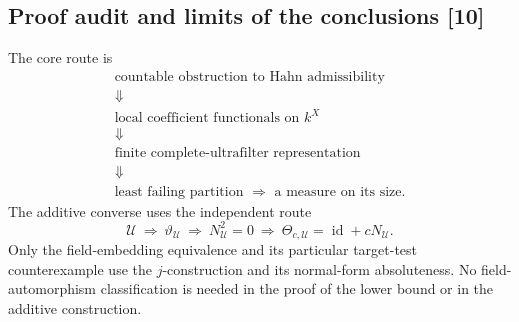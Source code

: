 \documentclass[11pt,letterpaper]{article}
\numberwithin{equation}{section}
\theoremstyle{definition}
\theoremstyle{remark}
\newcommand{\src}[1]{\textup{\textsf{\small[#1]}}}%
\newcommand{\id}{\operatorname{id}}
\begin{document}
\subsection{Proof audit and limits of the conclusions \src{10}}
\label{lce:mf:sub:audit}
The core route is
\[
 \begin{gathered}
 \text{countable obstruction to Hahn admissibility}\\
 \Downarrow\\
 \text{local coefficient functionals on }k^X\\
 \Downarrow\\
 \text{finite complete-ultrafilter representation}\\
 \Downarrow\\
 \text{least failing partition }\Longrightarrow\text{ a measure on its size}.
 \end{gathered}
\]
The additive converse uses the independent route
\[
 \mathcal U\ \Longrightarrow\ \vartheta_{\mathcal U}\ \Longrightarrow\
 N_{\mathcal U}^2=0\ \Longrightarrow\ \Theta_{c,\mathcal U}=\id+cN_{\mathcal U}.
\]
Only the field-embedding equivalence and its particular target-test
counterexample use the $j$-construction and its normal-form absoluteness. No
field-automorphism classification is needed in the proof of the lower bound
or in the additive construction.
\end{document}
